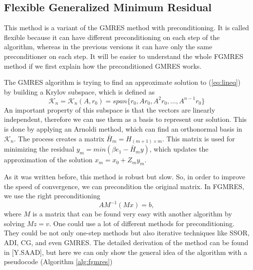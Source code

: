 \subsection{Flexible Generalized Minimum Residual}

This method is a variant of the GMRES method with preconditioning. It is called flexible because it can have different preconditioning on each step of the algorithm, whereas in the previous versions it can have only the same preconditioner on each step. It will be easier to understand the whole FGMRES method if we first explain how the preconditioned GMRES works.

The GMRES algorithm is trying to find an approximate solution to (\ref{eq:lineq}) by building a Krylov subspace, which is defined as
\begin{equation}
    \mathcal{K}_n = \mathcal{K}_n (A, r_0) = span \{ r_0, Ar_0, A^2r_0,\hdots, A^{n-1}r_0 \}
\end{equation}
An important property of this subspace is that the vectors are linearly independent, therefore we can use them as a basis to represent our solution. This is done by applying an Arnoldi method, which can find an orthonormal basis in $\mathcal{K}_n$. The process creates a matrix $\bar{H}_m = H_{(m+1)\times m}$. This matrix is used for minimizing the residual $y_m = min(\beta e_1 - \bar{H}_m y)$, which updates the approximation of the solution $x_m = x_0 + Z_my_m$.

As it was written before, this method is robust but slow. So, in order to improve the speed of convergence, we can precondition the original matrix. In FGMRES, we use the right preconditioning
\begin{equation}
    AM^{-1}(Mx) = b,
\end{equation}
where $M$ is a matrix that can be found very easy with another algorithm by solving $Mz = v$. One could use a lot of different methods for preconditioning. They could be not only one-step methods but also iterative techniques like SSOR, ADI, CG, and even GMRES. The detailed derivation of the method can be found in [Y.SAAD], but here we can only show the general idea of the algorithm with a pseudocode (Algorithm \ref{alg:fgmres})

